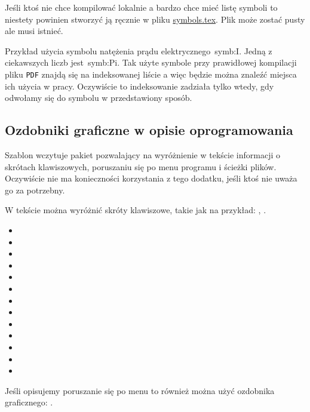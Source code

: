 Jeśli ktoś nie chce kompilować lokalnie a bardzo chce mieć listę symboli to niestety powinien stworzyć ją ręcznie w pliku \href{./symbols.tex}{symbols.tex}. Plik może zostać pusty ale musi istnieć.

Przykład użycia symbolu natężenia prądu elektrycznego~\gls{symb:I}. Jedną z ciekawszych liczb jest~\gls{symb:Pi}. Tak użyte symbole przy prawidłowej kompilacji pliku \texttt{PDF} znajdą się na indeksowanej liście a więc będzie można znaleźć miejsca ich użycia w pracy. Oczywiście to indeksowanie zadziała tylko wtedy, gdy odwołamy się do symbolu w przedstawiony sposób.

\subsection{Ozdobniki graficzne w opisie oprogramowania}
Szablon wczytuje pakiet pozwalający na wyróżnienie w tekście informacji o skrótach klawiszowych, poruszaniu się po menu programu i ścieżki plików. Oczywiście nie ma konieczności korzystania z tego dodatku, jeśli ktoś nie uważa go za potrzebny.

W tekście można wyróżnić skróty klawiszowe, takie jak na przykład: , \keys{\ctrl, \Alt, \del}.
\begin{itemize}
	\item {}
	\item \keys{\Space} \keys{\SPACE}
	\item \keys{\backspace} \keys{\del} \keys{\backdel}
	\item \keys{\return} \keys{\enter}
	\item \keys{\shift} \keys{\capslock}
	\item \keys{\ctrl} \keys{\Alt} \keys{\AltGr}
	\item \keys{\tab}
	\item \keys{\esc} \keys{\oldesc}
	\item \keys{\winmenu}
	\item \keys{\arrowkey{^}} \keys{\arrowkeyup}
	\item {} \keys{\arrowkeydown}
	\item \keys{\arrowkey{>}} \keys{\arrowkeyright}
	\item \keys{\arrowkey{<}} \keys{\arrowkeyleft}
\end{itemize}

Jeśli opisujemy poruszanie się po menu to również można użyć ozdobnika graficznego: .

